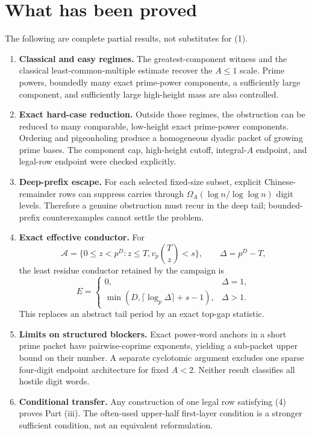 \documentclass[11pt]{article}
\newcommand{\choosef}[2]{\binom{#1}{#2}}
\begin{document}
\section{What has been proved}

The following are complete partial results, not substitutes for (1).

\begin{enumerate}
\item \textbf{Classical and easy regimes.}
The greatest-component witness and the classical least-common-multiple
estimate recover the $A\leq1$ scale.  Prime powers, boundedly many exact
prime-power components, a sufficiently large component, and sufficiently
large high-height mass are also controlled.

\item \textbf{Exact hard-case reduction.}
Outside those regimes, the obstruction can be reduced to many comparable,
low-height exact prime-power components.  Ordering and pigeonholing produce a
homogeneous dyadic packet of growing prime bases.  The component cap,
high-height cutoff, integral-$A$ endpoint, and legal-row endpoint were checked
explicitly.

\item \textbf{Deep-prefix escape.}
For each selected fixed-size subset, explicit Chinese-remainder rows can
suppress carries through
$\Omega_A(\log n/\log\log n)$ digit levels.  Therefore a genuine obstruction
must recur in the deep tail; bounded-prefix counterexamples cannot settle the
problem.

\item \textbf{Exact effective conductor.}
For
\[
 \mathcal A=\{0\leq z<p^D:z\leq T, v_p\choosef Tz<s\},
 \qquad \Delta=p^D-T,
\]
the least residue conductor retained by the campaign is
\[
 E=
 \begin{cases}
 0,&\Delta=1,\\
 \min\!\left(D,\lceil\log_p\Delta\rceil+s-1\right),&\Delta>1.
 \end{cases}                                                \tag{6}
\]
This replaces an abstract tail period by an exact top-gap statistic.

\item \textbf{Limits on structured blockers.}
Exact power-word anchors in a short prime packet have pairwise-coprime
exponents, yielding a sub-packet upper bound on their number.  A separate
cyclotomic argument excludes one sparse four-digit endpoint architecture for
fixed $A<2$.  Neither result classifies all hostile digit words.

\item \textbf{Conditional transfer.}
Any construction of one legal row satisfying (4) proves Part (iii).  The
often-used upper-half first-layer condition is a stronger sufficient
condition, not an equivalent reformulation.
\end{enumerate}
\end{document}
